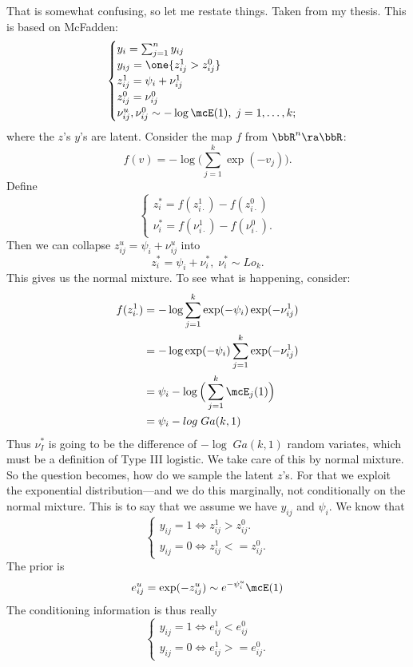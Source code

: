 \documentclass{article}
\begin{document}
That is somewhat confusing, so let me restate things.  Taken from my thesis.
This is based on McFadden:
\[
\begin{cases}
y_i = \sum_{j=1}^n y_{ij} \\
y_{ij} = \one \{z_{ij}^1 > z_{ij}^0 \} \\
z_{ij}^1 = \psi_i + \nu_{ij}^1 \\
z_{ij}^0 = \nu_{ij}^0 \\
\nu_{ij}^u, \nu_{ij}^0 \sim - \log \mcE(1), \; j = 1, \ldots, k;
\end{cases}
\]
where the $z$'s $y$'s are latent.  Consider the map $f$ from $\bbR^n \ra \bbR$:
\[
f(v) = - \log \Big( \sum_{j=1}^k \exp(-v_j) \Big).
\]
Define
\[
\begin{cases}
z_i^* = f( z_{i \cdot}^1) - f(z_{i \cdot}^0) \\
\nu_i^* = f(\nu_{i\cdot}^1) - f(\nu_{i\cdot}^0).
\end{cases}
\]
Then we can collapse $z_{ij}^u = \psi_i + \nu_{ij}^u$ into
\[
z_i^* = \psi_i + \nu_{i}^*, \; \nu_i^* \sim Lo_k.
\]
This gives us the normal mixture.  To see what is happening, consider:
\begin{align*}
f(z_{i \cdot}^1) & = - \log \sum_{j=1}^k \exp(-\psi_i)\exp(-\nu_{ij}^1) \\
& = - \log  \exp(-\psi_i) \sum_{j=1}^k \exp(-\nu_{ij}^1) \\ 
& = \psi_i - \log \Big( \sum_{j=1}^k \mcE_j(1) \Big) \\
& = \psi_i - log \; Ga(k,1) \\
\end{align*}
Thus $\nu_I^*$ is going to be the difference of $- \log \; Ga(k,1)$ random
variates, which must be a definition of Type III logistic.  We take care of this
by normal mixture.  So the question becomes, how do we sample the latent $z$'s.
For that we exploit the exponential distribution---and we do this marginally,
not conditionally on the normal mixture.  This is to say that we assume we have
$y_{ij}$ and $\psi_i$.  We know that
\[
\begin{cases}
y_{ij} = 1 \iff z_{ij}^1 > z_{ij}^0. \\
y_{ij} = 0 \iff z_{ij}^1 <= z_{ij}^0.
\end{cases}
\]
The prior is
\[
e_{ij}^u = \exp(- z_{ij}^u) \sim e^{- \psi_i^u} \mcE(1)
\]
The conditioning information is thus really
\[
\begin{cases}
y_{ij} = 1 \iff e_{ij}^1 < e_{ij}^0 \\
y_{ij} = 0 \iff e_{ij}^1 >= e_{ij}^0.
\end{cases}
\]
\end{document}
